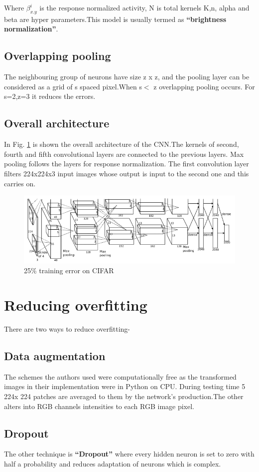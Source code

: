 \documentclass{article}
\begin{document}
Where $\beta^{i}_{x.y}$ is the response normalized activity, N is total kernels
K,n, alpha and beta are hyper parameters.This model is usually termed as \textbf{“brightness normalization”}\cite{jarrett2009best}.
\subsection{Overlapping pooling}
The neighbouring group of neurons have size z x z, and the pooling layer can be considered as a grid of s spaced pixel.When s$<$ z overlapping pooling occurs. For s=2,z=3 it reduces the errors. 


\subsection{Overall architecture}
In  Fig. \ref{fig:my_label4} is shown the overall architecture of the CNN.The kernels of second, fourth and fifth convolutional layers are connected to the previous layers. Max pooling follows the layers for response normalization. 
The first convolution layer filters 224x224x3 input images whose output is input to the second one and this carries on.
\begin{figure}[h]
 \centering
    \includegraphics[width=.8\textwidth]{pic2.png}
    \caption{25\% training error on CIFAR}
    \label{fig:my_label4}
\end{figure}

\section{Reducing overfitting}
There are two ways to reduce overfitting-
\subsection{Data augmentation}
The schemes the authors used were computationally free as the transformed images in their implementation were in Python on CPU. During testing time 5 224x 224 patches are averaged to them by the network's production.The other alters into RGB channels intensities  to each RGB image pixel.
\subsection{Dropout}
The other technique is \textbf{“Dropout”}\cite{hinton2012improving} where every hidden neuron is set to zero with half a probability and reduces adaptation of neurons which is complex.
\end{document}
